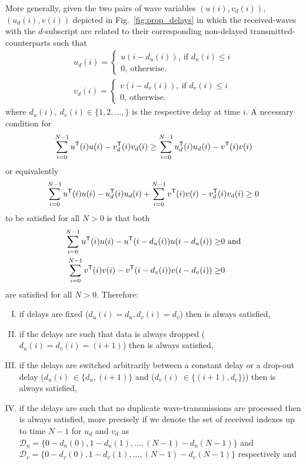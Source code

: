 \begin{proposition}
\label{P:passive_t_d_con}
More generally, given the two pairs of wave variables $(u(i),v_d(i))$, $(u_d(i),v(i))$ depicted in Fig.~\ref{fig:prop_delays} in which the received-waves with the $d$-subscript are related to their corresponding non-delayed transmitted-counterparts such that
\begin{align*}
u_d(i) = \begin{cases}
u(i-d_u(i)),\ \text{if $d_u(i) \leq i$}\\
0,\ \text{otherwise.}
\end{cases}\\
v_d(i) = \begin{cases}
v(i-d_v(i)),\ \text{if $d_v(i) \leq i$}\\
0,\ \text{otherwise.}
\end{cases}
\end{align*}
where $d_u(i),\ d_v(i) \in \{1,2,\dots,\}$ is the respective delay at time $i$.  A necessary condition for 
\begin{equation}
\label{E:key_wave_equation}
\sum_{i=0}^{N-1}u^{\mathsf{T}} (i)u(i) - v_d^{\mathsf{T}} (i) v_d(i) \geq \sum_{i=0}^{N-1} u_d^{\mathsf{T}} (i)u_d(i) - v^{\mathsf{T}} (i) v(i)
\end{equation}
or equivalently
\begin{equation*}
\sum_{i=0}^{N-1}u^{\mathsf{T}} (i)u(i) - u_d^{\mathsf{T}} (i) u_d(i) + \sum_{i=0}^{N-1} v^{\mathsf{T}} (i)v(i) - v_d^{\mathsf{T}} (i) v_d(i) \geq 0
\end{equation*}
to be satisfied for all $N > 0$ is that both
\begin{align*}
\sum_{i=0}^{N-1}u\tr (i)u(i) - u\tr (i-d_u(i)) u(i-d_u(i)) \geq& 0\ \text{and}\\
\sum_{i=0}^{N-1} v\tr (i)v(i) - v\tr (i-d_v(i)) v(i-d_v(i)) \geq& 0
\end{align*}
are satisfied for all $N > 0$.  Therefore:
\begin{enumerate}[I.]
\item \label{P:p_t_d_c_1}if delays are fixed ($d_u(i)=d_u, d_v(i)=d_v$) then  is always satisfied,
\item \label{P:p_t_d_c_2}if the delays are such that data is always dropped ($d_u(i)=d_v(i)=(i+1)$) then  is always satisfied,
\item \label{P:p_t_d_c_3}if the delays are switched arbitrarily between a constant delay or a drop-out delay ($d_u(i)\ \in \{d_u,(i+1)\}$ and ($d_v(i)\ \in \{(i+1),d_v\}$)) then  is always satisfied,
\item \label{P:p_t_d_c_4}if the delays are such that no duplicate wave-transmissions are processed then  is always satisfied, more precisely if we denote the set of received indexes up to time $N-1$ for $u_d$ and $v_d$ as $\mathcal{D}_u = \{0-d_u(0),1-d_u(1),\dots,(N-1)-d_u(N-1)\}$ and $\mathcal{D}_v = \{0-d_v(0),1-d_v(1),\dots,(N-1)-d_v(N-1)\}$ respectively and

\end{enumerate}
\end{proposition}
